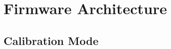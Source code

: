 \documentclass[12pt,a4paper,twoside]{article}
\begin{document}
    \section{Firmware Architecture}


    \subsection{Calibration Mode}
    

\end{document}
